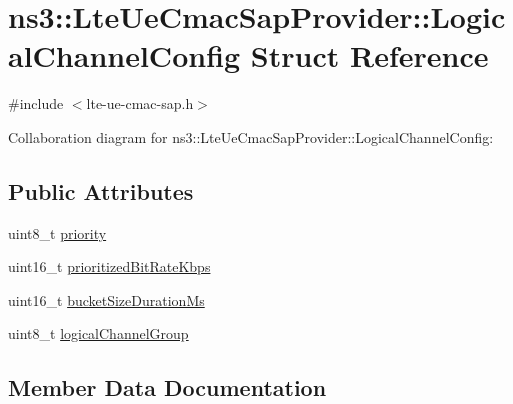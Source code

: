 \hypertarget{structns3_1_1LteUeCmacSapProvider_1_1LogicalChannelConfig}{}\section{ns3\+:\+:Lte\+Ue\+Cmac\+Sap\+Provider\+:\+:Logical\+Channel\+Config Struct Reference}
\label{structns3_1_1LteUeCmacSapProvider_1_1LogicalChannelConfig}


{\ttfamily \#include $<$lte-\/ue-\/cmac-\/sap.\+h$>$}



Collaboration diagram for ns3\+:\+:Lte\+Ue\+Cmac\+Sap\+Provider\+:\+:Logical\+Channel\+Config\+:
\subsection*{Public Attributes}
\begin{DoxyCompactItemize}
\item 
uint8\+\_\+t \hyperlink{structns3_1_1LteUeCmacSapProvider_1_1LogicalChannelConfig_a888f361757024fac54e5b1e704872303}{priority}
\item 
uint16\+\_\+t \hyperlink{structns3_1_1LteUeCmacSapProvider_1_1LogicalChannelConfig_a4d1039e3e8f0a6a470dda3fe111341a6}{prioritized\+Bit\+Rate\+Kbps}
\item 
uint16\+\_\+t \hyperlink{structns3_1_1LteUeCmacSapProvider_1_1LogicalChannelConfig_a6dc85f68ac5440e517fa8bddcfd2e302}{bucket\+Size\+Duration\+Ms}
\item 
uint8\+\_\+t \hyperlink{structns3_1_1LteUeCmacSapProvider_1_1LogicalChannelConfig_ae59849b9e18363975fe38e2d60ecb728}{logical\+Channel\+Group}
\end{DoxyCompactItemize}


\subsection{Member Data Documentation}
